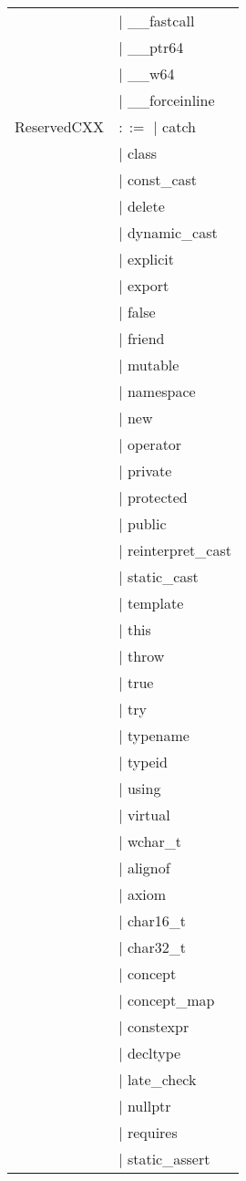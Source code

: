 \documentclass[a4paper]{article}
\begin{document}
\begin{tabular}{ll}
&$\mid$ \_\_fastcall\\
&$\mid$ \_\_ptr64\\
&$\mid$ \_\_w64\\
&$\mid$ \_\_forceinline\\
ReservedCXX & $::=$ $\mid$ catch\\
&$\mid$ class\\
&$\mid$ const\_cast\\
&$\mid$ delete\\
&$\mid$ dynamic\_cast\\
&$\mid$ explicit\\
&$\mid$ export\\
&$\mid$ false\\
&$\mid$ friend\\
&$\mid$ mutable\\
&$\mid$ namespace\\
&$\mid$ new\\
&$\mid$ operator\\
&$\mid$ private\\
&$\mid$ protected\\
&$\mid$ public\\
&$\mid$ reinterpret\_cast\\
&$\mid$ static\_cast\\
&$\mid$ template\\
&$\mid$ this\\
&$\mid$ throw\\
&$\mid$ true\\
&$\mid$ try\\
&$\mid$ typename\\
&$\mid$ typeid\\
&$\mid$ using\\
&$\mid$ virtual\\
&$\mid$ wchar\_t\\
&$\mid$ alignof\\
&$\mid$ axiom\\
&$\mid$ char16\_t\\
&$\mid$ char32\_t\\
&$\mid$ concept\\
&$\mid$ concept\_map\\
&$\mid$ constexpr\\
&$\mid$ decltype\\
&$\mid$ late\_check\\
&$\mid$ nullptr\\
&$\mid$ requires\\
&$\mid$ static\_assert\\

\end{tabular}
\end{document}
